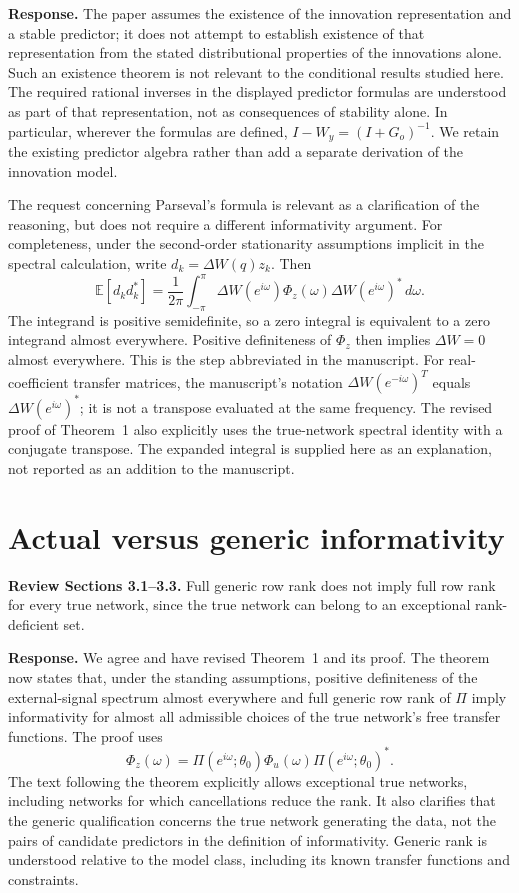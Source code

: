 \documentclass[11pt]{article}
\begin{document}
\textbf{Response.}
The paper assumes the existence of the innovation representation and a stable
predictor; it does not attempt to establish existence of that representation
from the stated distributional properties of the innovations alone. Such an
existence theorem is not relevant to the conditional results studied here.
The required rational inverses in the displayed predictor formulas are
understood as part of that representation, not as consequences of stability
alone. In particular, wherever the formulas are defined,
$I-W_y=(I+G_o)^{-1}$. We retain the existing predictor algebra rather than add a
separate derivation of the innovation model.

The request concerning Parseval's formula is relevant as a clarification of
the reasoning, but does not require a different informativity argument.
For completeness, under the second-order stationarity assumptions implicit in
the spectral calculation, write $d_k=\Delta W(q)z_k$. Then
\[
\mathbb E[d_kd_k^*]=\frac{1}{2\pi}\int_{-\pi}^{\pi}
\Delta W(e^{i\omega})\Phi_z(\omega)\Delta W(e^{i\omega})^*\,d\omega.
\]
The integrand is positive semidefinite, so a zero integral is equivalent to a
zero integrand almost everywhere. Positive definiteness of $\Phi_z$ then
implies $\Delta W=0$ almost everywhere. This is the step abbreviated in the
manuscript. For real-coefficient transfer matrices, the manuscript's notation
$\Delta W(e^{-i\omega})^T$ equals $\Delta W(e^{i\omega})^*$; it is not a
transpose evaluated at the same frequency. The revised proof of Theorem~1
also explicitly uses the true-network spectral identity with a conjugate
transpose. The expanded integral is supplied here as an explanation, not
reported as an addition to the manuscript.

\section{Actual versus generic informativity}
\textbf{Review Sections 3.1--3.3.}
Full generic row rank does not imply full row rank for every true network, since
the true network can belong to an exceptional rank-deficient set.

\textbf{Response.}
We agree and have revised Theorem~1 and its proof. The theorem now states that,
under the standing assumptions, positive definiteness of the external-signal
spectrum almost everywhere and full generic row rank of $\Pi$ imply
informativity for almost all admissible choices of the true network's free
transfer functions. The proof uses
\[
\Phi_z(\omega)=\Pi(e^{i\omega};\theta_0)\Phi_u(\omega)
\Pi(e^{i\omega};\theta_0)^*.
\]
The text following the theorem explicitly allows exceptional true networks,
including networks for which cancellations reduce the rank. It also clarifies
that the generic qualification concerns the true network generating the data,
not the pairs of candidate predictors in the definition of informativity.
Generic rank is understood relative to the model class, including its known
transfer functions and constraints.
\end{document}

